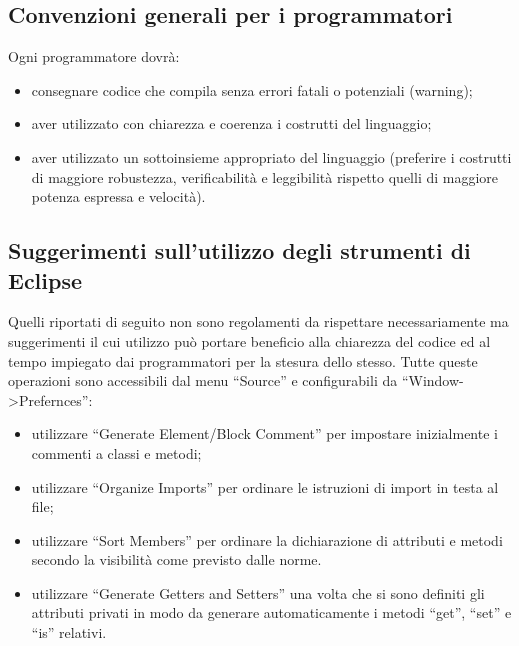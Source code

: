 \subsection{Convenzioni generali per i programmatori}
Ogni programmatore dovr\`a:
\begin{itemize}
  \item{consegnare codice che compila senza errori fatali o
potenziali (warning);} 
  \item{aver utilizzato con chiarezza e coerenza i costrutti del
linguaggio;}
  \item{aver utilizzato un sottoinsieme appropriato del linguaggio
(preferire i costrutti di maggiore robustezza, verificabilit\`a e leggibilit\`a
rispetto quelli di maggiore potenza espressa e velocit\`a).}
\end{itemize}

\subsection{Suggerimenti sull'utilizzo degli strumenti di Eclipse}
Quelli riportati di seguito non sono regolamenti da rispettare necessariamente
ma suggerimenti il cui utilizzo pu\`o portare beneficio alla chiarezza del
codice ed al tempo impiegato dai programmatori per la stesura dello stesso.
Tutte queste operazioni sono accessibili dal menu ``Source'' e configurabili da
``Window->Prefernces'':
\begin{itemize}
  \item utilizzare ``Generate Element/Block Comment'' per impostare inizialmente
  i commenti a classi e metodi;
  \item utilizzare ``Organize Imports'' per ordinare le istruzioni di import in
  testa al file;
  \item utilizzare ``Sort Members'' per ordinare la dichiarazione di attributi e
  metodi secondo la visibilit\`a come previsto dalle norme.
  \item utilizzare ``Generate Getters and Setters'' una volta che si sono
  definiti gli attributi privati in modo da generare automaticamente i metodi
  ``get'', ``set'' e ``is'' relativi.
\end{itemize}












